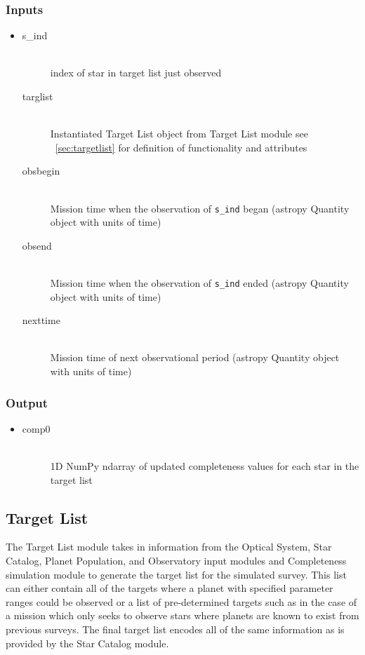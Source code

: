 \documentclass[cleanfoot]{asme2ej}
\begin{document}
\subsubsection*{Inputs}
\begin{itemize}
    \item 
    \begin{description}
        \item[s\_ind] \hfill \\
        index of star in target list just observed
        \item[targlist] \hfill \\
        Instantiated Target List object from Target List module see ~\ref{sec:targetlist} for definition of functionality and attributes
        \item[obsbegin] \hfill \\
        Mission time when the observation of \verb+s_ind+ began (astropy Quantity object with units of time)
        \item[obsend] \hfill \\
        Mission time when the observation of \verb+s_ind+ ended (astropy Quantity object with units of time)
        \item[nexttime] \hfill \\
        Mission time of next observational period (astropy Quantity object with units of time)
    \end{description}
\end{itemize}

\subsubsection*{Output}
\begin{itemize}
    \item 
    \begin{description}
        \item[comp0] \hfill \\
        1D NumPy ndarray of updated completeness values for each star in the target list
    \end{description}
\end{itemize}


\subsection{Target List}
The Target List module takes in information from the Optical System, Star Catalog, Planet Population, and Observatory input modules and Completeness simulation module to generate the target list for the simulated survey.  This list can either contain all of the targets where a planet with specified parameter ranges could be observed or a list of pre-determined targets such as in the case of a mission which only seeks to observe stars where planets are known to exist from previous surveys.  The final target list encodes all of the same information as is provided by the Star Catalog module.
\end{document}
